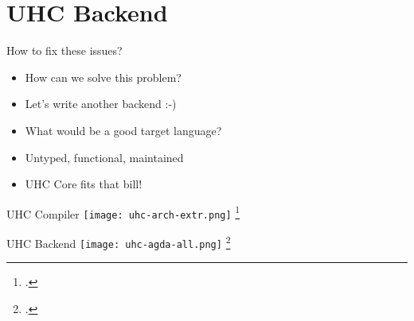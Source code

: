 \section{UHC Backend}

\begin{frame}{How to fix these issues?}
\begin{itemize}
\item How can we solve this problem?
\pause \item Let's write another backend :-)
\pause \item What would be a good target language?
\pause \item Untyped, functional, maintained
\pause \item UHC Core fits that bill!
\end{itemize}
\end{frame}

\begin{frame}[fragile]{UHC Compiler}
\hspace{3cm}
\texttt{[image: uhc-arch-extr.png]}
\footcite{dijkstra2009architecture}
\end{frame}

\begin{frame}[fragile]{UHC Backend}
\texttt{[image: uhc-agda-all.png]}
\footcite{dijkstra2009architecture}
\end{frame}




